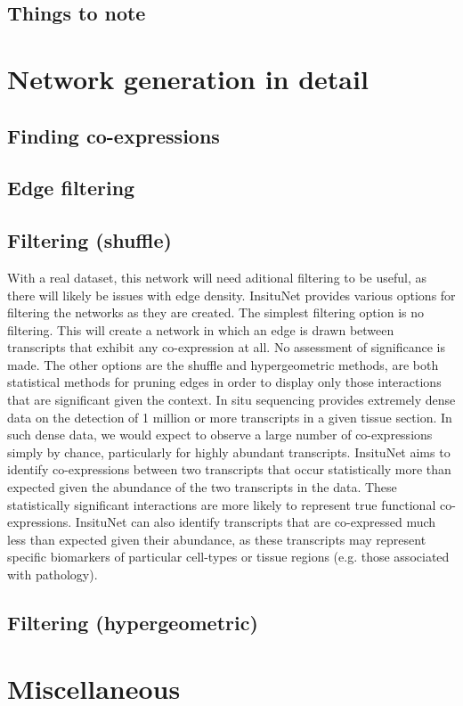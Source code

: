 \documentclass[a4paper,12pt]{article}
\begin{document}
\subsection{Things to note}

\section{Network generation in detail}

\subsection{Finding co-expressions}
\subsection{Edge filtering}
\subsection{Filtering (shuffle)}
With a real dataset, this network will need aditional filtering to be useful, as there will likely be issues with edge density. InsituNet provides various options for filtering the networks as they are created. The simplest filtering option is no filtering. This will create a network in which an edge is drawn between transcripts that exhibit any co-expression at all. No assessment of significance is made. The other options are the shuffle and hypergeometric methods, are both statistical methods for pruning edges in order to display only those interactions that are significant given the context.
In situ sequencing provides extremely dense data on the detection of 1 million or more transcripts in a given tissue section. In such dense data, we would expect to observe a large number of co-expressions simply by chance, particularly for highly abundant transcripts. InsituNet aims to identify co-expressions between two transcripts that occur statistically more than expected given the abundance of the two transcripts in the data. These statistically significant interactions are more likely to represent true functional co-expressions. InsituNet can also identify transcripts that are co-expressed much less than expected given their abundance, as these transcripts may represent specific biomarkers of particular cell-types or tissue regions (e.g. those associated with pathology).
\subsection{Filtering (hypergeometric)}

\section{Miscellaneous}
\end{document}
